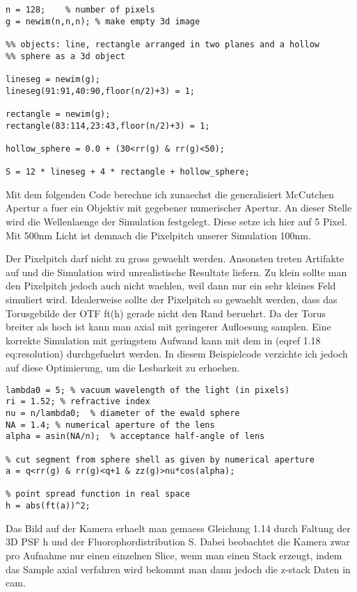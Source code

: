 \begin{lstlisting}[style=mymatlab]
n = 128;    % number of pixels 
g = newim(n,n,n); % make empty 3d image

%% objects: line, rectangle arranged in two planes and a hollow
%% sphere as a 3d object

lineseg = newim(g);
lineseg(91:91,40:90,floor(n/2)+3) = 1;

rectangle = newim(g);
rectangle(83:114,23:43,floor(n/2)+3) = 1;

hollow_sphere = 0.0 + (30<rr(g) & rr(g)<50); 

S = 12 * lineseg + 4 * rectangle + hollow_sphere;
\end{lstlisting}

Mit dem folgenden Code berechne ich zunaechst die generalisiert
McCutchen Apertur a fuer ein Objektiv mit gegebener numerischer
Apertur. An dieser Stelle wird die Wellenlaenge der Simulation
festgelegt. Diese setze ich hier auf 5 Pixel. Mit 500nm Licht ist
demnach die Pixelpitch unserer Simulation 100nm. 

 Der Pixelpitch darf nicht zu gross gewaehlt werden. Ansonsten treten
Artifakte auf und die Simulation wird unrealistische Resultate
liefern. Zu klein sollte man den Pixelpitch jedoch auch nicht
waehlen, weil dann nur ein sehr kleines Feld simuliert wird.
Idealerweise sollte der Pixelpitch so gewaehlt werden, dass das
Torusgebilde der OTF ft(h) gerade nicht den Rand beruehrt. Da der
Torus breiter als hoch ist kann man axial mit geringerer Aufloesung
samplen. Eine korrekte Simulation mit geringstem Aufwand kann mit
dem in (eqref 1.18 eq:resolution) durchgefuehrt werden.  In diesem
Beispielcode verzichte ich jedoch auf diese Optimierung, um die
Lesbarkeit zu erhoehen.


\begin{lstlisting}[style=mymatlab]
%% incoherent 3d point spread function
lambda0 = 5; % vacuum wavelength of the light (in pixels)
ri = 1.52; % refractive index
nu = n/lambda0;  % diameter of the ewald sphere 
NA = 1.4; % numerical aperture of the lens
alpha = asin(NA/n);  % acceptance half-angle of lens

% cut segment from sphere shell as given by numerical aperture
a = q<rr(g) & rr(g)<q+1 & zz(g)>nu*cos(alpha);  

% point spread function in real space
h = abs(ft(a))^2;
\end{lstlisting}

Das Bild auf der Kamera erhaelt man gemaess Gleichung 1.14 durch
Faltung der 3D PSF h und der Fluorophordistribution S. Dabei
beobachtet die Kamera zwar pro Aufnahme nur einen einzelnen Slice,
wenn man einen Stack erzeugt, indem das Sample axial verfahren wird
bekommt man dann jedoch die z-stack Daten in cam.

